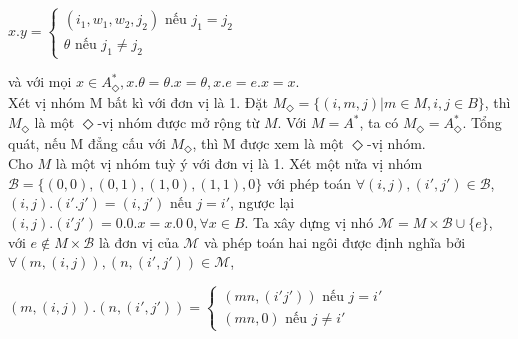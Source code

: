 $x.y= \begin{cases}
    (i_1, w_1, w_2, j_2) \text{ nếu     } j_1 = j_2\\
    \theta \text{       nếu         } j_1 \ne j_2
\end{cases}
$
\begin{flushleft}
\hspace{20mm}và với mọi $x \in A^*_\Diamond, x.\theta = \theta.x = \theta, x.e = e.x = x$.\\
\hspace{10mm}Xét vị nhóm M bất kì với đơn vị là 1. Đặt $M_\Diamond = \{ (i,m,j) | m \in M, i,j \in B \}$, thì $M_\Diamond$ là một $\Diamond$-vị nhóm được mở rộng từ $M$. Với $M = A^*$, ta có $M_\Diamond = A^*_\Diamond$. Tổng quát, nếu M đẳng cấu với $M_\Diamond$, thì M được xem là một $\Diamond$-vị nhóm.\\
\hspace{10mm}Cho $M$ là một vị nhóm tuỳ ý với đơn vị là 1. Xét một nửa vị nhóm $\mathcal{B} = \{ (0,0),(0,1),(1,0),(1,1),0 \}$ với phép toán $\forall (i,j),(i',j') \in \mathcal{B}$, $(i,j).(i'.j') = (i,j')$ nếu $j = i'$, ngược lại $(i,j).(i'j') = 0. 0.x = x.0 \ 0, \forall x \in B$. Ta xây dựng vị nhó $\mathcal{M}= M \times \mathcal{B} \cup \{e\}$, với $e \not\in M \times \mathcal{B}$ là đơn vị của $\mathcal{M}$ và phép toán hai ngôi được định nghĩa bởi $\forall (m,(i,j)), (n,(i',j')) \in \mathcal{M}$,
\end{flushleft}
$
    (m,(i,j)).(n,(i',j')) = \begin{cases}
        (mn, (i'j')) \text{     nếu     } j = i'\\
        (mn, 0) \text{  nếu     }  j \ne i'
    \end{cases}
$
